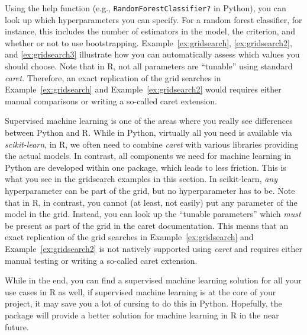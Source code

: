 Using the help function (e.g., \texttt{RandomForestClassifier?} in Python),
you can look up
which hyperparameters you can specify. For a random forest classifier,
for instance, this includes the number of estimators in the model, the
criterion, and whether or not to use
bootstrapping. Example~\ref{ex:gridsearch}, \ref{ex:gridsearch2}, and
\ref{ex:gridsearch3} illustrate how you can automatically assess which
values you should choose.
Note that in R, not all parameters are ``tunable'' using standard \emph{caret}. Therefore, an exact replication of the grid searches in Example~\ref{ex:gridsearch} and Example~\ref{ex:gridsearch2} would requires either manual comparisons or writing a so-called caret extension.




\begin{feature}
    Supervised machine learning is one of the areas where you really
    see differences between Python and R. While in Python, virtually
    all you need is available via \emph{scikit-learn}, in R, we often
    need to combine \emph{caret} with various libraries providing the
    actual models. In contrast, all components we need for machine
    learning in Python are developed within one package, which leads
    to less friction. This is what you see in the gridsearch examples
    in this section. In scikit-learn, \emph{any} hyperparameter can be
    part of the grid, but no hyperparameter has to be.  Note that in
    R, in contrast, you cannot (at least, not easily) put any
    parameter of the model in the grid. Instead, you can look up the
    ``tunable parameters'' which \emph{must} be present as part of the
    grid in the caret documentation. This means that an exact
    replication of the grid searches in Example~\ref{ex:gridsearch} and
    Example~\ref{ex:gridsearch2} is not natively supported using \emph{caret}
    and requires either manual testing or writing a so-called caret
    extension.

    While in the end, you can find a supervised machine learning
    solution for all your use cases in R as well, if supervised
    machine learning is at the core of your project, it may save you a
    lot of cursing to do this in Python.
    Hopefully, the  package will provide a better solution for machine learning in R
    in the near future.
\end{feature}
